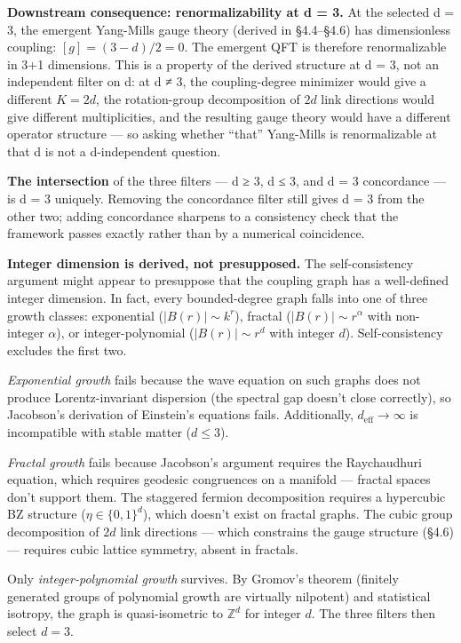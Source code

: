 \documentclass[
]{article}
\begin{document}
\textbf{Downstream consequence: renormalizability at d = 3.} At the
selected d = 3, the emergent Yang-Mills gauge theory (derived in
§4.4--§4.6) has dimensionless coupling: \([g] = (3-d)/2 = 0\). The
emergent QFT is therefore renormalizable in 3+1 dimensions. This is a
property of the derived structure at d = 3, not an independent filter on
d: at d ≠ 3, the coupling-degree minimizer would give a different
\(K = 2d\), the rotation-group decomposition of \(2d\) link directions
would give different multiplicities, and the resulting gauge theory
would have a different operator structure --- so asking whether ``that''
Yang-Mills is renormalizable at that d is not a d-independent question.

\textbf{The intersection} of the three filters --- d ≥ 3, d ≤ 3, and d =
3 concordance --- is d = 3 uniquely. Removing the concordance filter
still gives d = 3 from the other two; adding concordance sharpens to a
consistency check that the framework passes exactly rather than by a
numerical coincidence.

\textbf{Integer dimension is derived, not presupposed.} The
self-consistency argument might appear to presuppose that the coupling
graph has a well-defined integer dimension. In fact, every
bounded-degree graph falls into one of three growth classes: exponential
(\(|B(r)| \sim k^r\)), fractal (\(|B(r)| \sim r^\alpha\) with
non-integer \(\alpha\)), or integer-polynomial (\(|B(r)| \sim r^d\) with
integer \(d\)). Self-consistency excludes the first two.

\emph{Exponential growth} fails because the wave equation on such graphs
does not produce Lorentz-invariant dispersion (the spectral gap doesn't
close correctly), so Jacobson's derivation of Einstein's equations
fails. Additionally, \(d_{\text{eff}} \to \infty\) is incompatible with
stable matter (\(d \leq 3\)).

\emph{Fractal growth} fails because Jacobson's argument requires the
Raychaudhuri equation, which requires geodesic congruences on a manifold
--- fractal spaces don't support them. The staggered fermion
decomposition requires a hypercubic BZ structure
(\(\eta \in \{0,1\}^d\)), which doesn't exist on fractal graphs. The
cubic group decomposition of \(2d\) link directions --- which constrains
the gauge structure (§4.6) --- requires cubic lattice symmetry, absent
in fractals.

Only \emph{integer-polynomial growth} survives. By Gromov's theorem
(finitely generated groups of polynomial growth are virtually nilpotent)
and statistical isotropy, the graph is quasi-isometric to
\(\mathbb{Z}^d\) for integer \(d\). The three filters then select
\(d = 3\).
\end{document}
